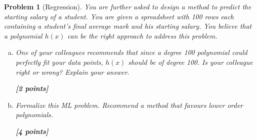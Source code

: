 \documentclass[11pt]{article}
\newtheorem{problem}{Problem}
\newcommand{\point}[1]{\hfill {\bf [#1 points]}}
\newif\ifsolutions
\newcommand{\solution}[1]{
\ifsolutions
\smallskip
\par
\noindent\emph{Solution: } #1
\fi
}
\begin{document}
\begin{problem}[Regression] \em 
You are further asked to design a method to predict the starting  salary of a student. You are given a spreadsheet with 100 rows each containing a student's final average mark and his starting salary.
 You believe that a polynomial $h(x)$ can be the right approach to address this problem.
\begin{enumerate}[(a)]
\item One of your colleagues recommends that since a degree 100 polynomial could perfectly fit your data points, $h(x)$ should be of degree 100. Is your colleague right or wrong? Explain your answer.

\point{2}
\solution{ 

[Present your solution here...]

}
\item Formalize this ML problem. Recommend a method that favours lower order polynomials. 

\point{4}
\solution{

[Present your solution here...]
}
\end{enumerate}


\end{problem}
\end{document}
